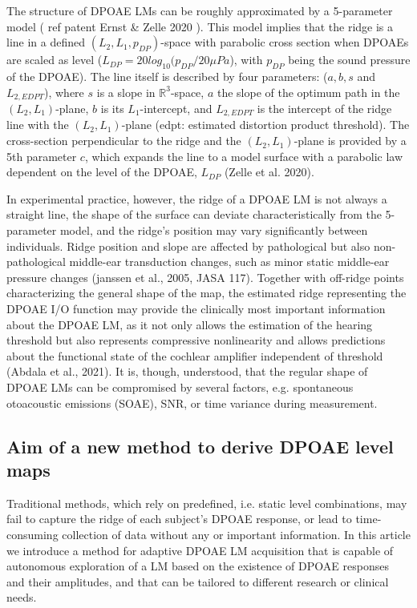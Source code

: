 \documentclass[journal,twoside,web]{ieeecolor2}
\begin{document}
The structure of DPOAE LMs can be roughly approximated by a 5-parameter model ( ref patent Ernst \& Zelle 2020 ). This model implies that the ridge is a line in a defined $(L_2, L_1, p_{DP})$-space with parabolic cross section when DPOAEs are scaled as level ($L_{DP}=20 log_{10} (p_{DP}/20 \mu Pa$), with $p_{DP}$ being the sound pressure of the DPOAE). The line itself is described by four parameters: ($a, b, s$ and $L_{2,EDPT}$), where $s$ is a slope in $\mathbb{R}^3$-space, $a$ the slope of the optimum path in the $(L_2, L_1)$-plane, $b$ is its $L_1$-intercept, and $L_{2,EDPT}$ is the intercept of the ridge line with the $(L_2, L_1)$-plane (edpt: estimated distortion product threshold). The cross-section perpendicular to the ridge and the $(L_2, L_1)$-plane is provided by a 5th parameter $c$, which expands the line to a model surface with a parabolic law dependent on the level of the DPOAE, $L_{DP}$ (Zelle et al. 2020).

In experimental practice, however, the ridge of a DPOAE LM is not always a straight line, the shape of the surface can deviate characteristically from the 5-parameter model, and the ridge’s position may vary significantly between individuals. Ridge position and slope are affected by pathological but also non-pathological middle-ear transduction changes, such as minor static middle-ear pressure changes (janssen et al., 2005, JASA 117). Together with off-ridge points characterizing the general shape of the map, the estimated ridge representing the DPOAE I/O function may provide the clinically most important information about the DPOAE LM, as it not only allows the estimation of the hearing threshold but also represents compressive nonlinearity and allows predictions about the functional state of the cochlear amplifier independent of threshold (Abdala et al., 2021). It is, though, understood, that the regular shape of DPOAE LMs can be compromised by several factors, e.g. spontaneous otoacoustic emissions (SOAE), SNR, or time variance during measurement.

\subsection{Aim of a new method to derive DPOAE level maps}
Traditional methods, which rely on predefined, i.e. static level combinations, may fail to capture the ridge of each subject’s DPOAE response, or lead to time-consuming collection of data without any or important information. In this article we introduce a method for adaptive DPOAE LM acquisition that is capable of autonomous exploration of a LM based on the existence of DPOAE responses and their amplitudes, and that can be tailored to different research or clinical needs.
\end{document}

